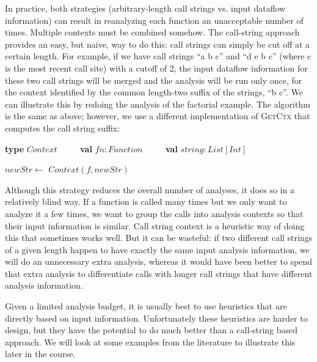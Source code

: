 \documentclass[11pt]{article}
\begin{document}
In practice, both strategies (arbitrary-length call strings vs. input dataflow information) can
result in reanalyzing each function an unacceptable number of times. 
Multiple contexts must be combined somehow. The call-string approach provides an easy, but naive, way to do this: call strings can simply be
cut off at a certain length. For example, if we have call strings ``a b c'' and ``d e b c'' (where c is the
most recent call site) with a cutoff of 2, the input dataflow information for these two call strings
will be merged and the analysis will be run only once, for the context identified by the common
length-two suffix of the strings, ``b c''. We can illustrate this by redoing the analysis of the factorial
example. The algorithm is the same as above; however, we use a different implementation of
\textsc{GetCtx} that computes the call string suffix:


\begin{algorithmic}
\State \textbf{type} $Context$
\State~~~~ \textbf{val} $fn : Function$
\State~~~~ \textbf{val} $string : List[Int]$

\bigskip

    \State $newStr \gets $
    \State \Return $Context(f, newStr)$
\EndFunction

\end{algorithmic}

Although this strategy reduces the overall number of analyses, it does so in a relatively blind
way. If a function is called many times but we only want to analyze it a few times, we want to
group the calls into analysis contexts so that their input information is similar. Call string context
is a heuristic way of doing this that sometimes works well. But it can be wasteful: if two different
call strings of a given length happen to have exactly the same input analysis information, we will
do an unnecessary extra analysis, whereas it would have been better to spend that extra analysis
to differentiate calls with longer call strings that have different analysis information.

Given a limited analysis budget, it is usually best to use heuristics that are directly based on
input information. Unfortunately these heuristics are harder to design, but they have the potential
to do much better than a call-string based approach. We will look at some examples from the
literature to illustrate this later in the course.
\end{document}
